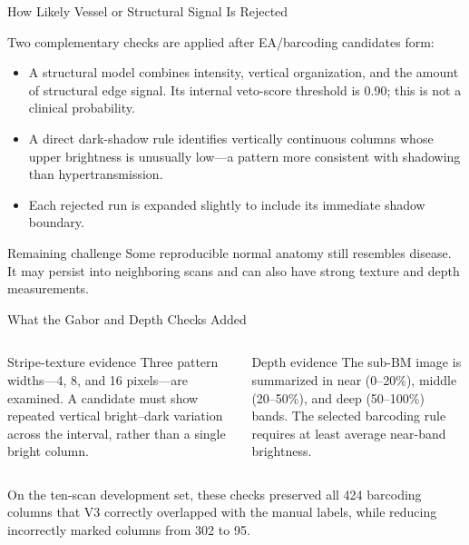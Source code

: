 \documentclass[aspectratio=169]{beamer}
\begin{document}
\begin{frame}{How Likely Vessel or Structural Signal Is Rejected}

Two complementary checks are applied after EA/barcoding candidates form:

\begin{itemize}
    \item A structural model combines intensity, vertical organization, and
    the amount of structural edge signal. Its internal veto-score threshold is
    0.90; this is not a clinical probability.
    \item A direct dark-shadow rule identifies vertically continuous columns
    whose upper brightness is unusually low---a pattern more consistent with
    shadowing than hypertransmission.
    \item Each rejected run is expanded slightly to include its immediate
    shadow boundary.
\end{itemize}

\begin{alertblock}{Remaining challenge}
Some reproducible normal anatomy still resembles disease. It may persist into
neighboring scans and can also have strong texture and depth measurements.
\end{alertblock}

\end{frame}

\begin{frame}{What the Gabor and Depth Checks Added}

\begin{columns}[T]
\begin{block}{Stripe-texture evidence}
Three pattern widths---4, 8, and 16 pixels---are examined. A candidate must
show repeated vertical bright--dark variation across the interval, rather than
a single bright column.
\end{block}

\begin{block}{Depth evidence}
The sub-BM image is summarized in near (0--20\%), middle (20--50\%), and deep
(50--100\%) bands. The selected barcoding rule requires at least average
near-band brightness.
\end{block}
\end{columns}

\vspace{0.4cm}

On the ten-scan development set, these checks preserved all 424 barcoding
columns that V3 correctly overlapped with the manual labels, while reducing
incorrectly marked columns from 302 to 95.

\end{frame}
\end{document}
